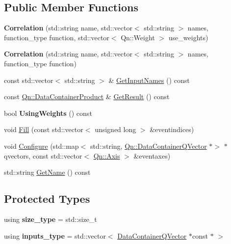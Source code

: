 \subsection*{Public Member Functions}
\begin{DoxyCompactItemize}
\item 
\mbox{\label{classQn_1_1Correlation_af74345757ee9db8c537dbfe2339bfb3f}} 
{\bfseries Correlation} (std\+::string name, std\+::vector$<$ std\+::string $>$ names, function\+\_\+type function, std\+::vector$<$ Qn\+::\+Weight $>$ use\+\_\+weights)
\item 
\mbox{\label{classQn_1_1Correlation_a6bf01af42ef293b175d7587776d64685}} 
{\bfseries Correlation} (std\+::string name, std\+::vector$<$ std\+::string $>$ names, function\+\_\+type function)
\item 
const std\+::vector$<$ std\+::string $>$ \& \mbox{\hyperlink{classQn_1_1Correlation_a8cfb95a94185bf9d816b068973123bc8}{Get\+Input\+Names}} () const
\item 
const \mbox{\hyperlink{classQn_1_1DataContainer}{Qn\+::\+Data\+Container\+Product}} \& \mbox{\hyperlink{classQn_1_1Correlation_a09105a0c076d62b3e3073bf43986da57}{Get\+Result}} () const
\item 
\mbox{\label{classQn_1_1Correlation_a3c791b19b769388b8bd4719d0fb4095d}} 
bool {\bfseries Using\+Weights} () const
\item 
void \mbox{\hyperlink{classQn_1_1Correlation_afc02d9cca889ff4ee3af7fa75131c6dd}{Fill}} (const std\+::vector$<$ unsigned long $>$ \&eventindices)
\item 
void \mbox{\hyperlink{classQn_1_1Correlation_af1c6d506b693424d56d0a796d4b50873}{Configure}} (std\+::map$<$ std\+::string, \mbox{\hyperlink{classQn_1_1DataContainer}{Qn\+::\+Data\+Container\+Q\+Vector}} $\ast$$>$ $\ast$qvectors, const std\+::vector$<$ \mbox{\hyperlink{classQn_1_1Axis}{Qn\+::\+Axis}} $>$ \&eventaxes)
\item 
std\+::string \mbox{\hyperlink{classQn_1_1Correlation_a6b24af1a3d28b9f60ce03277192a3cc4}{Get\+Name}} () const
\end{DoxyCompactItemize}
\subsection*{Protected Types}
\begin{DoxyCompactItemize}
\item 
\mbox{\label{classQn_1_1Correlation_af5ff319de795c7a17a166310ac8462bc}} 
using {\bfseries size\+\_\+type} = std\+::size\+\_\+t
\item 
\mbox{\label{classQn_1_1Correlation_afeffd6309b7b18d7b48bafecea9099ea}} 
using {\bfseries inputs\+\_\+type} = std\+::vector$<$ \mbox{\hyperlink{classQn_1_1DataContainer}{Data\+Container\+Q\+Vector}} $\ast$const $\ast$ $>$
\end{DoxyCompactItemize}


